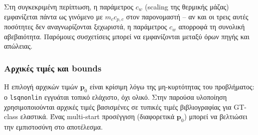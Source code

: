 Στη συγκεκριμένη περίπτωση, η παράμετρος $c_w$ (scaling της θερμικής μάζας) εμφανίζεται
πάντα ως γινόμενο με $m_c c_{p,c}$ στον παρονομαστή -- αν και οι τρεις αυτές ποσότητες δεν
αναγνωρίζονται ξεχωριστά, η παράμετρος $c_w$ απορροφά τη συνολική αβεβαιότητα. Παρόμοιες
συσχετίσεις μπορεί να εμφανίζονται μεταξύ όρων πηγής και απώλειας.


\subsubsection{Αρχικές τιμές και bounds}

Η επιλογή αρχικών τιμών $\mathbf{p}_0$ είναι κρίσιμη λόγω της μη-κυρτότητας του
προβλήματος: ο \texttt{lsqnonlin} εγγυάται τοπικό ελάχιστο, όχι ολικό. Στην παρούσα
υλοποίηση χρησιμοποιούνται αρχικές τιμές βασισμένες σε τυπικές τιμές βιβλιογραφίας για
GT-class ελαστικά. Ένας multi-start προσέγγιση (διαφορετικά $\mathbf{p}_0$) μπορεί να
βελτιώσει την εμπιστοσύνη στο αποτέλεσμα.

